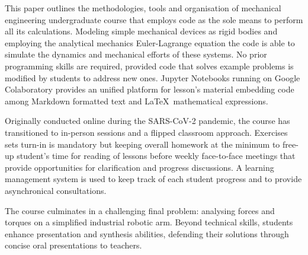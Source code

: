 This paper outlines the methodologies, tools and organisation of mechanical engineering undergraduate course that employs code as the sole means to perform all its calculations. Modeling simple mechanical devices as rigid bodies and employing the analytical mechanics Euler-Lagrange equation the code is able to simulate the dynamics and mechanical efforts of these systems. No prior programming skills are required, provided code that solves example problems is modified by students to address new ones. Jupyter Notebooks running on Google Colaboratory provides an unified platform for lesson's material embedding code among Markdown formatted text and \LaTeX\ mathematical expressions. 

Originally conducted online during the SARS-CoV-2 pandemic, the course has transitioned to in-person sessions and a flipped classroom approach. Exercises sets turn-in is mandatory but keeping overall homework at the minimum to free-up student's time for reading of lessons before weekly face-to-face meetings that provide opportunities for clarification and progress discussions. A learning management system is used to keep track of each student progress and to provide asynchronical consultations.

The course culminates in a challenging final problem: analysing forces and torques on a simplified industrial robotic arm. Beyond technical skills, students enhance presentation and synthesis abilities, defending their solutions through concise oral presentations to teachers.
